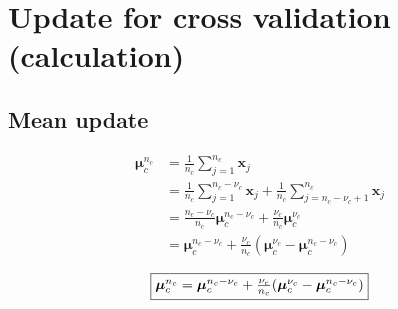 \documentclass[a4paper,11pt,DIV=16]{scrartcl}
\begin{document}











\newpage

\appendix
\section{Update for cross validation (calculation)}
\label{app:cv_maj}

    \subsection{Mean update}
        \begin{align*}
            \boldsymbol{\mu}_c^{n_c} &= \frac{1}{n_c} \sum_{j = 1}^{n_c} \mathbf{x}_j \\
                        &= \frac{1}{n_c} \sum_{j = 1}^{n_c-\nu_c} \mathbf{x}_j + \frac{1}{n_c} \sum_{j = n_c-\nu_c +1}^{n_c} \mathbf{x}_j \\
                        &= \frac{n_c-\nu_c}{n_c} \boldsymbol{\mu}_c^{n_c-\nu_c} + \frac{\nu_c}{n_c} \boldsymbol{\mu}_c^{\nu_c} \\
                        &= \boldsymbol{\mu}_c^{n_c-\nu_c} + \frac{\nu_c}{n_c} (\boldsymbol{\mu}_c^{\nu_c} - \boldsymbol{\mu}_c^{n_c-\nu_c})
        \end{align*}

        \begin{equation}
             \fbox{$\boldsymbol{\mu}_c^{n_c} = \boldsymbol{\mu}_c^{n_c-\nu_c} + \frac{\nu_c}{n_c} (\boldsymbol{\mu}_c^{\nu_c} - \boldsymbol{\mu}_c^{n_c-\nu_c})$}
        \end{equation}
\end{document}
